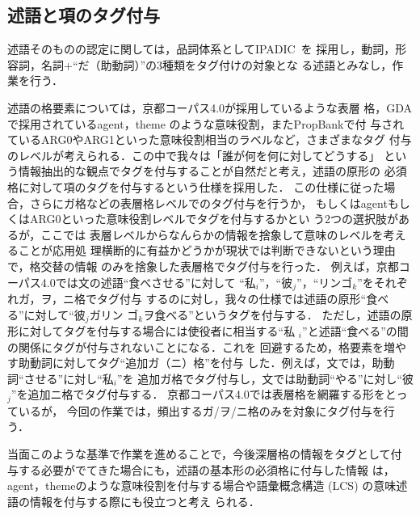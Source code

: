 \documentclass[japanese]{jnlp_1.4}
\begin{document}
\subsection{述語と項のタグ付与}
\label{ssec:spec_pred}

述語そのものの認定に関しては，品詞体系としてIPADIC~\cite{Asahara:03}を
採用し，動詞，形容詞，名詞+``だ（助動詞）''の3種類をタグ付けの対象とな
る述語とみなし，作業を行う．

述語の格要素については，京都コーパス4.0が採用しているような表層
格，GDAで採用されているagent，theme のような意味役割，またPropBankで付
与されているARG0やARG1といった意味役割相当のラベルなど，さまざまなタグ
付与のレベルが考えられる．この中で我々は「誰が何を何に対してどうする」
という情報抽出的な観点でタグを付与することが自然だと考え，述語の原形の
必須格に対して項のタグを付与するという仕様を採用した．
この仕様に従った場合，さらにガ格などの表層格レベルでのタグ付与を行うか，
もしくはagentもしくはARG0といった意味役割レベルでタグを付与するかとい
う2つの選択肢があるが，ここでは
表層レベルからなんらかの情報を捨象して意味のレベルを考えることが応用処
理横断的に有益かどうかが現状では判断できないという理由で，格交替の情報
のみを捨象した表層格でタグ付与を行った．
例えば，京都コーパス4.0では文の述語``食べさせる''に対して
``私$_i$''，``彼$_j$''，``リンゴ$_k$''をそれぞれガ，ヲ，ニ格でタグ付与
するのに対し，我々の仕様では述語の原形``食べる''に対して``彼$_j$ガリン
ゴ$_k$ヲ食べる''というタグを付与する．
ただし，述語の原形に対してタグを付与する場合には使役者に相当する``私
$_i$''と述語``食べる''の間の関係にタグが付与されないことになる．これを
回避するため，格要素を増やす助動詞に対してタグ``追加ガ（ニ）格''を付与
した．例えば，文では，助動詞``させる''に対し``私$_i$''を
追加ガ格でタグ付与し，文では助動詞``やる''に対し``彼
$_j$''を追加ニ格でタグ付与する．
京都コーパス4.0では表層格を網羅する形をとっているが，
今回の作業では，頻出するガ/ヲ/ニ格のみを対象にタグ付与を行う．

当面このような基準で作業を進めることで，今後深層格の情報をタグとして付
与する必要がでてきた場合にも，述語の基本形の必須格に付与した情報
は，agent，themeのような意味役割を付与する場合や語彙概念構造 (LCS) \cite{Jackendoff:90}の意味述語の情報を付与する際にも役立つと考え
られる．
\end{document}
